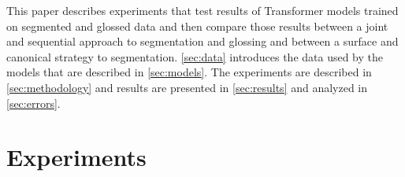 This paper describes experiments that test results of Transformer models \citep{vaswani_attention_2017} trained on segmented and glossed data and then compare those results between a joint and sequential approach to segmentation and glossing and between a surface and canonical strategy to segmentation. \autoref{sec:data} introduces the data used by the models that are described in \autoref{sec:models}. The experiments are described in \autoref{sec:methodology} and results are presented in \autoref{sec:results} and analyzed in \autoref{sec:errors}. 



\begin{comment}

\section{Data}
\label{sec:data}

Each project's unique priorities and workflow resulted in different amounts of data and percentages of segmented and glossed tokens, as shown in Table \ref{tab:dissdata}. .

\begin{table}
    \centering
    \begin{tabular}{l|r|rc}
         \textbf{Language} & \textbf{Tokens} & \multicolumn{2}{c}{\textbf{Seg/Gloss}} \\
         \hline
         Alas & 4.5k & 3,775 & 85\%  \\
         \hline
         Lamkang & 101k & 49,465 & 49\% \\
         \hline
         Lezgi & 14k & 13,262  & 94\% \\
         \hline
         Manipuri & 12k & 11,904 & 98\% \\
         \hline
         Natügu & 16.5k & 13,925 & 84\%  \\
         \hline
         Upper Tanana & 11,867 & 67\% 
    \end{tabular}
    \caption[Data for Segmentation and Glossing]{The approximate total token considers multiple word expressions (when parsed as such) as single tokens. The percentage and total number of tokens that are both segmented (canonical and surface) and glossed are shown.}
    \label{tab:data}
\end{table}

\end{comment}



\section{Experiments}
\label{sec:methodology}

